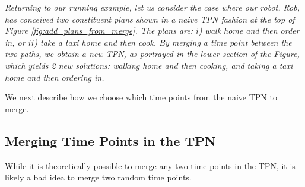 

\begin{tcolorbox}[colback=red!5!white,colframe=red!75!black]
  \textit{Returning to our running example, let us consider the case where our robot, Rob, has conceived two constituent plans
   shown in a \textit{naive} TPN fashion at the top of Figure \ref{fig:add_plans_from_merge}.
   The plans are: $i$) walk home and then order in, or $ii$) take a taxi home and then cook.
   By merging a time point between the two paths, we obtain a new TPN, as portrayed in the lower section of the Figure, which yields 2 
   new solutions: walking home and then cooking, and taking a taxi home and then ordering in.
  }
\end{tcolorbox}

We next describe how we choose which time points from the naive TPN to merge.

\subsection{Merging Time Points in the TPN} 
While it is theoretically possible to merge any two time points in the TPN, it is likely a bad idea to merge two random time points. 

